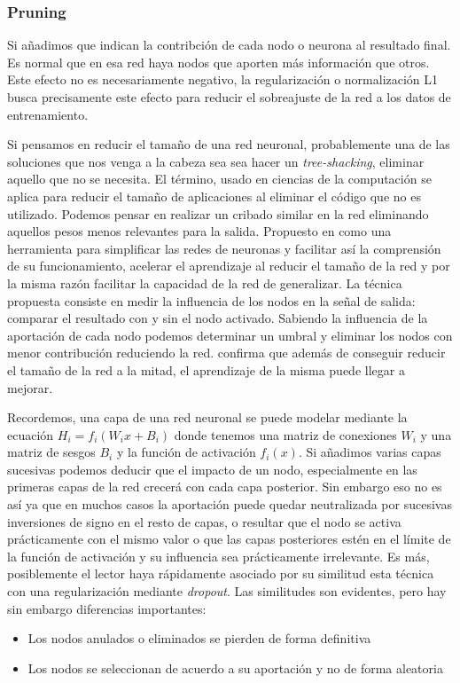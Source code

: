\subsubsection{Pruning}

Si añadimos que indican la contribción de cada nodo o neurona al resultado final. Es normal que en esa red haya nodos que aporten más información que otros. Este efecto no es necesariamente negativo, la regularización o normalización L1 busca precisamente este efecto para reducir el sobreajuste de la red a los datos de entrenamiento.


Si pensamos en reducir el tamaño de una red neuronal, probablemente una de las soluciones que nos venga a la cabeza sea sea hacer un \textit{tree-shacking}, eliminar aquello que no se necesita. El término, usado en ciencias de la computación se aplica para reducir el tamaño de aplicaciones al eliminar el código que no es utilizado. Podemos pensar en realizar un cribado similar en la red eliminando aquellos pesos menos relevantes para la salida. Propuesto en  como una herramienta para simplificar las redes de neuronas y facilitar así la comprensión de su funcionamiento, acelerar el aprendizaje al reducir el tamaño de la red y por la misma razón facilitar la capacidad de la red de generalizar. La técnica propuesta consiste en medir la influencia de los nodos en la señal de salida: comparar el resultado con y sin el nodo activado. Sabiendo la influencia de la aportación de cada nodo podemos determinar un umbral y eliminar los nodos con menor contribución reduciendo la red.  confirma que además de conseguir reducir el tamaño de la red a la mitad, el aprendizaje de la misma puede llegar a mejorar.


Recordemos, una capa de una red neuronal se puede modelar mediante la ecuación $H_i = f_i(W_ix+B_i)$ donde tenemos una matriz de conexiones $W_{i}$ y una matriz de sesgos $B_{i}$ y la función de activación $f_i(x)$. Si añadimos varias capas sucesivas podemos deducir que el impacto de un nodo, especialmente en las primeras capas de la red crecerá con cada capa posterior. Sin embargo eso no es así ya que en muchos casos la aportación puede quedar neutralizada por sucesivas inversiones de signo en el resto de capas, o resultar que el nodo se activa prácticamente con el mismo valor o que las capas posteriores estén en el límite de la función de activación y su influencia sea prácticamente irrelevante\cite{Mozer1989}. Es más, posiblemente el lector haya rápidamente asociado por su similitud esta técnica con una regularización mediante \textit{dropout}. Las similitudes son evidentes, pero hay sin embargo diferencias importantes:
\begin{itemize}
  \item Los nodos anulados o eliminados se pierden de forma definitiva
  \item Los nodos se seleccionan de acuerdo a su aportación y no de forma aleatoria
\end{itemize}

